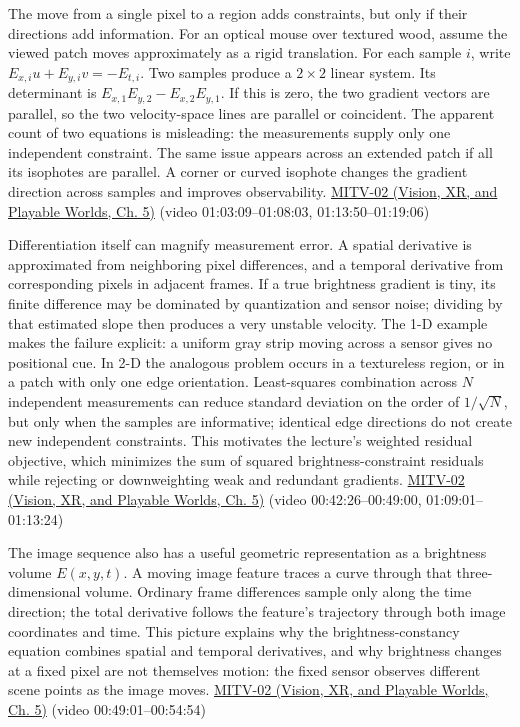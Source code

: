 The move from a single pixel to a region adds constraints, but only if their directions add information. For an optical mouse over textured wood, assume the viewed patch moves approximately as a rigid translation. For each sample \(i\), write \(E_{x,i}u+E_{y,i}v=-E_{t,i}\). Two samples produce a \(2\times2\) linear system. Its determinant is \(E_{x,1}E_{y,2}-E_{x,2}E_{y,1}\). If this is zero, the two gradient vectors are parallel, so the two velocity-space lines are parallel or coincident. The apparent count of two equations is misleading: the measurements supply only one independent constraint. The same issue appears across an extended patch if all its isophotes are parallel. A corner or curved isophote changes the gradient direction across samples and improves observability. \href{../07-Vision-XR-and-Playable-Worlds/main.pdf\#nameddest=04-visual-computing-ii-ch036-mitv-02---image-formation-perspective-projection-time-derivative-motion-field}{MITV-02 (Vision, XR, and Playable Worlds, Ch. 5)} (video 01:03:09--01:08:03, 01:13:50--01:19:06)

Differentiation itself can magnify measurement error. A spatial derivative is approximated from neighboring pixel differences, and a temporal derivative from corresponding pixels in adjacent frames. If a true brightness gradient is tiny, its finite difference may be dominated by quantization and sensor noise; dividing by that estimated slope then produces a very unstable velocity. The 1-D example makes the failure explicit: a uniform gray strip moving across a sensor gives no positional cue. In 2-D the analogous problem occurs in a textureless region, or in a patch with only one edge orientation. Least-squares combination across \(N\) independent measurements can reduce standard deviation on the order of \(1/\sqrt{N}\), but only when the samples are informative; identical edge directions do not create new independent constraints. This motivates the lecture's weighted residual objective, which minimizes the sum of squared brightness-constraint residuals while rejecting or downweighting weak and redundant gradients. \href{../07-Vision-XR-and-Playable-Worlds/main.pdf\#nameddest=04-visual-computing-ii-ch036-mitv-02---image-formation-perspective-projection-time-derivative-motion-field}{MITV-02 (Vision, XR, and Playable Worlds, Ch. 5)} (video 00:42:26--00:49:00, 01:09:01--01:13:24)

The image sequence also has a useful geometric representation as a brightness volume \(E(x,y,t)\). A moving image feature traces a curve through that three-dimensional volume. Ordinary frame differences sample only along the time direction; the total derivative follows the feature's trajectory through both image coordinates and time. This picture explains why the brightness-constancy equation combines spatial and temporal derivatives, and why brightness changes at a fixed pixel are not themselves motion: the fixed sensor observes different scene points as the image moves. \href{../07-Vision-XR-and-Playable-Worlds/main.pdf\#nameddest=04-visual-computing-ii-ch036-mitv-02---image-formation-perspective-projection-time-derivative-motion-field}{MITV-02 (Vision, XR, and Playable Worlds, Ch. 5)} (video 00:49:01--00:54:54)

